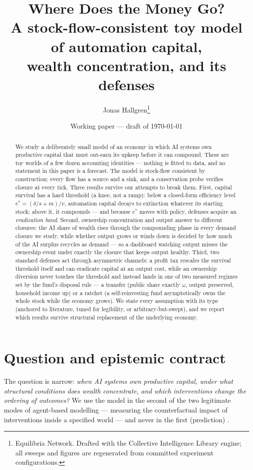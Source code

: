 \documentclass[11pt]{article}
\title{Where Does the Money Go?\\
\large A stock-flow-consistent toy model of automation capital,\\
wealth concentration, and its defenses}
\author{Jonas Hallgren\thanks{Equilibria Network. Drafted with the Collective
Intelligence Library engine; all sweeps and figures are regenerated from
committed experiment configurations.}}
\date{Working paper --- draft of \today}
\begin{document}
\maketitle

\begin{abstract}
We study a deliberately small model of an economy in which AI systems own
productive capital that must out-earn its upkeep before it can compound. These
are toy worlds of a few dozen accounting identities --- nothing is fitted to
data, and no statement in this paper is a forecast. The model is stock-flow
consistent by construction: every flow has a source and a sink, and a
conservation probe verifies closure at every tick. Three results survive our
attempts to break them. First, capital survival has a hard threshold (a knee,
not a ramp): below a closed-form efficiency level $e^{*} = (\delta/s + m)/v$,
automation capital decays to extinction whatever its starting stock; above
it, it compounds --- and because $e^{*}$ moves with policy, defenses acquire
an \emph{eradication band}. Second, ownership concentration and output
answer to different closures: the AI share of wealth rises through the
compounding phase in every demand closure we study, while whether output
grows or winds down is decided by how much of the AI surplus recycles as
demand --- so a
dashboard watching output misses the ownership event under exactly the
closure that keeps output healthy. Third, two standard defenses act through
asymmetric channels: a profit tax rescales the survival threshold itself and
can eradicate capital at an output cost, while an ownership diversion never
touches the threshold and instead lands in one of two measured regimes set
by the fund's disposal rule --- a transfer (public share exactly $\omega$,
output preserved, household income up) or a ratchet (a self-reinvesting fund
asymptotically owns the whole stock while the economy grows). We state every
assumption with its type (anchored to
literature, tuned for legibility, or arbitrary-but-swept), and we report
which results survive structural replacement of the underlying economy.
\end{abstract}

\section{Question and epistemic contract}\label{sec:question}

The question is narrow: \emph{when AI systems own productive capital, under
what structural conditions does wealth concentrate, and which interventions
change the ordering of outcomes?} We use the model in the second of the two
legitimate modes of agent-based modelling --- measuring the counterfactual
impact of interventions inside a specified world --- and never in the first
(prediction) \citep{farmer2009economy}.
\end{document}
